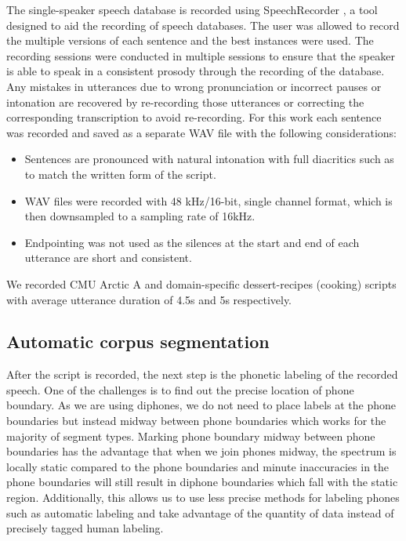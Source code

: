 \documentclass[lettersize,journal]{IEEEtran}
\begin{document}
The single-speaker speech database is recorded using SpeechRecorder \cite{speechrecorder}, a tool designed to aid the recording of speech databases. The user was allowed to record the multiple versions of each sentence and the best instances were used. The recording sessions were conducted in multiple sessions to ensure that the speaker is able to speak in a consistent prosody through the recording of the database. Any mistakes in utterances due to wrong pronunciation or incorrect pauses or intonation are recovered by re-recording those utterances or correcting the corresponding transcription to avoid re-recording. For this work each sentence was recorded and saved as a separate WAV file with the following considerations:
\begin{itemize}
    \item Sentences are pronounced with natural intonation with full diacritics such as to match the written form of the script.
    \item WAV files were recorded with 48 kHz/16-bit, single channel format, which is then downsampled to a sampling rate of 16kHz.
    \item Endpointing was not used as the silences at the start and end of each utterance are short and consistent.
\end{itemize}
We recorded CMU Arctic A \cite{Kominek2004TheCA} and domain-specific dessert-recipes (cooking) scripts with average utterance duration of 4.5s and 5s respectively.

\subsection{Automatic corpus segmentation}

After the script is recorded, the next step is the phonetic labeling of the recorded speech. One of the challenges is to find out the precise location of phone boundary. As we are using diphones, we do not need to place labels at the phone boundaries but instead midway between phone boundaries which works for the majority of segment types. Marking phone boundary midway between phone boundaries has the advantage that when we join phones midway, the spectrum is locally static compared to the phone boundaries and minute inaccuracies in the phone boundaries will still result in diphone boundaries which fall with the static region. Additionally, this allows us to use less precise methods for labeling phones such as automatic labeling and take advantage of the quantity of data instead of precisely tagged human labeling.
\end{document}
